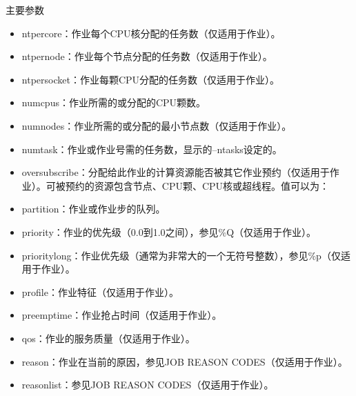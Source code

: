 \begin{frame}[fragile]{主要参数}
\begin{itemize}
\begin{itemize}
\begin{itemize}
    \item ntpercore：作业每个CPU核分配的任务数（仅适用于作业）。
    \item ntpernode：作业每个节点分配的任务数（仅适用于作业）。
    \item ntpersocket：作业每颗CPU分配的任务数（仅适用于作业）。
    \item numcpus：作业所需的或分配的CPU颗数。
    \item numnodes：作业所需的或分配的最小节点数（仅适用于作业）。
    \item numtask：作业或作业号需的任务数，显示的--ntasks设定的。
    \item oversubscribe：分配给此作业的计算资源能否被其它作业预约（仅适用于作业）。可被预约的资源包含节点、CPU颗、CPU核或超线程。值可以为：
   	\item partition：作业或作业步的队列。
   	\item priority：作业的优先级（0.0到1.0之间），参见\%Q（仅适用于作业）。
   	\item prioritylong：作业优先级（通常为非常大的一个无符号整数），参见\%p（仅适用于作业）。
   	\item profile：作业特征（仅适用于作业）。
   	\item preemptime：作业抢占时间（仅适用于作业）。
   	\item qos：作业的服务质量（仅适用于作业）。
   	\item reason：作业在当前的原因，参见JOB REASON CODES（仅适用于作业）。
   	\item reasonlist：参见JOB REASON CODES（仅适用于作业）。

\end{itemize}
\end{itemize}
\end{itemize}
\end{frame}

